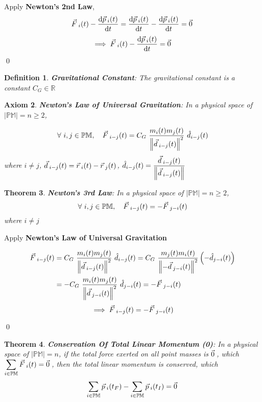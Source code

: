 \documentclass[12pt]{amsart}
\newtheorem{theorem}{Theorem}[section]
\newtheorem{definition}[theorem]{Definition}
\newtheorem{axiom}[theorem]{Axiom}
\renewenvironment{proof}{{\bfseries Proof.}}{\qed}
\let\oldvec\vec
\renewcommand{\vec}[1]{\oldvec{#1}\hspace{0.1em}}
\begin{document}
\begin{proof}
Apply \textbf{Newton's 2nd Law},
$$ \vec{F}_{i}(t) - \dfrac{\mathrm{d} \vec{p}_{i}(t)}{\mathrm{d} t} = \dfrac{\mathrm{d} \vec{p}_{i}(t)}{\mathrm{d} t} - \dfrac{\mathrm{d} \vec{p}_{i}(t)}{\mathrm{d} t} = \vec{0} $$
$$ \implies \vec{F}_{i}(t) - \dfrac{\mathrm{d} \vec{p}_{i}(t)}{\mathrm{d} t} = \vec{0} $$
\end{proof}

\begin{definition}
\textbf{Gravitational Constant}: The gravitational constant is a constant $C_G \in \mathbb{R}$
\end{definition}

\begin{axiom}
\textbf{Newton's Law of Universal Gravitation}: In a physical space of $\left | \mathbb{PM} \right | = n \ge 2$,

$$  \forall \  i,j \in \mathbb{PM}, \quad \vec{F}_{i-j}(t)= C_{G} \ \dfrac{m_i (t) m_j (t)}{\left \| \vec{d}_{i-j} (t)\right \|^2} \ \hat{d}_{i-j} (t) $$
where $i \ne j$, $\vec{d}_{i-j} (t) = \vec{r}_{i} (t)- \vec{r}_{j} (t)$, $\hat{d}_{i-j} (t) = \dfrac{\vec{d}_{i-j} (t)}{\left \| \vec{d}_{i-j} (t) \right \|}$
\end{axiom}

\begin{theorem}
\textbf{Newton's 3rd Law}: In a physical space of $\left | \mathbb{PM} \right | = n \ge 2 $, $$\forall \  i,j \in \mathbb{PM}, \quad \vec{F}_{i-j}(t)=-\vec{F}_{j-i}(t)$$
where $i \ne j$
\end{theorem}

\begin{proof}
Apply \textbf{Newton's Law of Universal Gravitation}

\begin{align*} \vec{F}_{i-j}(t) &= C_{G} \ \dfrac{m_i (t) m_j (t)}{\left \| \vec{d}_{i-j} (t) \right \|^2} \ \hat{d}_{i-j} (t) = C_{G} \ \dfrac{m_j (t) m_i (t)}{\left \|- \vec{d}_{j-i}(t) \right \|^2} \left (-\hat{d}_{j-i}(t) \right ) \\
&=- C_{G} \ \dfrac{m_i (t) m_j (t)}{\left \| \vec{d}_{j-i}(t) \right \|^2} \ \hat{d}_{j-i}(t) =- \vec{F}_{j-i}(t)
\end{align*}
$$ \implies \vec{F}_{i-j}(t) = - \vec{F}_{j-i}(t) $$

\end{proof}

\begin{theorem}
\textbf{Conservation Of Total Linear Momentum (0)}: In a physical space of $\left | \mathbb{PM} \right | = n$, if the total force exerted on all point masses is $\vec{0}$, which $\displaystyle\sum_{i \in \mathbb{PM}}\vec{F}_i (t)=\vec{0}$, then the total linear momentum is conserved, which $$ \sum_{i \in \mathbb{PM}} \vec{p}_{i}(t_F) - \sum_{i \in \mathbb{PM}} \vec{p}_{i}(t_I)  = \vec{0} $$
\end{theorem}
\end{document}
